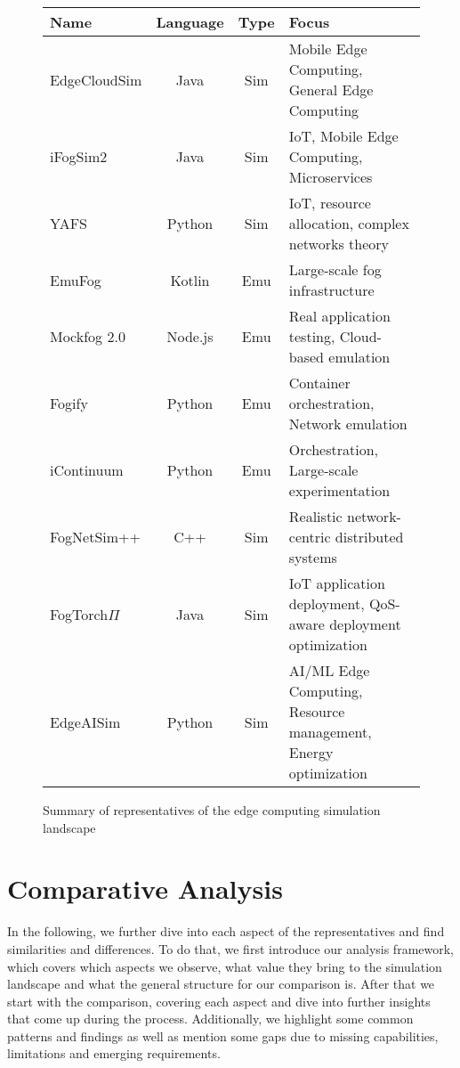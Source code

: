 \begin{figure}[H]
  \centering
  \begin{tabularx}{\textwidth}{l | c | c | X }
    \hline
    \textbf{Name} & \textbf{Language} & \textbf{Type} & \textbf{Focus} \\
    \hline\hline
    EdgeCloudSim  & Java & Sim & Mobile Edge Computing, General Edge Computing\\\hline
    iFogSim2      & Java & Sim & IoT, Mobile Edge Computing, Microservices\\\hline
    YAFS          & Python & Sim & IoT, resource allocation, complex networks theory\\\hline
    EmuFog        & Kotlin & Emu & Large-scale fog infrastructure\\\hline
    Mockfog 2.0   & Node.js & Emu & Real application testing, Cloud-based emulation\\\hline
    Fogify        & Python & Emu & Container orchestration, Network emulation\\\hline
    iContinuum    & Python & Emu & Orchestration, Large-scale experimentation\\\hline
    FogNetSim++   & C++ & Sim & Realistic network-centric distributed systems\\\hline
    FogTorch$\Pi$ & Java & Sim & IoT application deployment, QoS-aware deployment optimization\\\hline
    EdgeAISim     & Python & Sim & AI/ML Edge Computing, Resource management, Energy optimization\\\hline
  \end{tabularx}
  \caption{Summary of representatives of the edge computing simulation landscape}
  \label{tab:overview-table-representatives}
\end{figure}

\section{Comparative Analysis}
In the following, we further dive into each aspect of the representatives and find similarities and differences.
To do that, we first introduce our analysis framework, which covers which aspects we observe, what value they bring to the simulation landscape and what the general structure for our comparison is.
After that we start with the comparison, covering each aspect and dive into further insights that come up during the process.
Additionally, we highlight some common patterns and findings as well as mention some gaps due to missing capabilities, limitations and emerging requirements.

